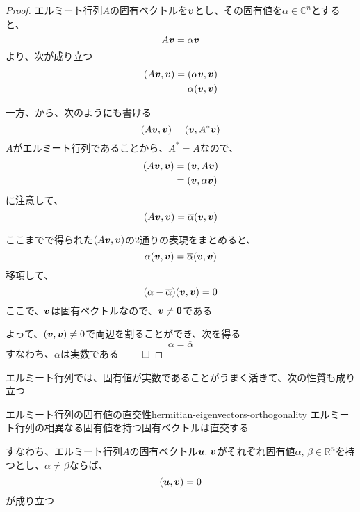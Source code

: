 \documentclass[../../../topic_linear-algebra]{subfiles}
\begin{document}
\begin{proof}
  エルミート行列$A$の固有ベクトルを$\vb*{v}$とし、その固有値を$\alpha \in \mathbb{C}^n$とすると、
  \begin{equation*}
    A\vb*{v} = \alpha \vb*{v}
  \end{equation*}
  より、次が成り立つ
  \begin{align*}
    (A\vb*{v}, \vb*{v}) & = (\alpha \vb*{v}, \vb*{v}) \\
                        & = \alpha (\vb*{v}, \vb*{v})
  \end{align*}
  \br

  一方、から、次のようにも書ける
  \begin{equation*}
    (A\vb*{v}, \vb*{v}) = (\vb*{v}, A^*\vb*{v})
  \end{equation*}
  $A$がエルミート行列であることから、$A^* = A$なので、
  \begin{align*}
    (A\vb*{v}, \vb*{v}) & = (\vb*{v}, A\vb*{v})      \\
                        & = (\vb*{v}, \alpha\vb*{v})
  \end{align*}
  に注意して、
  \begin{equation*}
    (A\vb*{v}, \vb*{v}) = \overline{\alpha}(\vb*{v}, \vb*{v})
  \end{equation*}

  \br

  ここまでで得られた$(A\vb*{v}, \vb*{v})$の2通りの表現をまとめると、
  \begin{equation*}
    \alpha (\vb*{v}, \vb*{v}) = \overline{\alpha}(\vb*{v}, \vb*{v})
  \end{equation*}
  移項して、
  \begin{equation*}
    (\alpha - \overline{\alpha})(\vb*{v}, \vb*{v}) = 0
  \end{equation*}
  ここで、$\vb*{v}$は固有ベクトルなので、$\vb*{v} \neq \vb*{0}$である

  よって、$(\vb*{v}, \vb*{v}) \neq 0$で両辺を割ることができ、次を得る
  \begin{equation*}
    \alpha = \overline{\alpha}
  \end{equation*}
  すなわち、$\alpha$は実数である $\qed$
\end{proof}

\sectionline

エルミート行列では、固有値が実数であることがうまく活きて、次の性質も成り立つ

\begin{theorem}{エルミート行列の固有値の直交性}{hermitian-eigenvectors-orthogonality}
  エルミート行列の相異なる固有値を持つ固有ベクトルは直交する

  すなわち、エルミート行列$A$の固有ベクトル$\vb*{u},\,\vb*{v}$がそれぞれ固有値$\alpha,\,\beta \in \mathbb{R}^n$を持つとし、$\alpha \neq \beta$ならば、
  \begin{equation*}
    (\vb*{u}, \vb*{v}) = 0
  \end{equation*}
  が成り立つ
\end{theorem}
\end{document}
